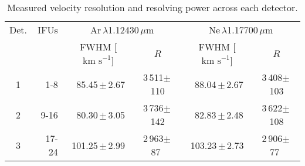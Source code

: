 \documentclass[iop]{emulateapj}
\def\lam{$\lambda$}
\def\kms{$\mbox{km s}^{-1}$}
\def\a{$\phantom{^\ast}$}
\def\o{$\phantom{0}$}
\begin{document}
\begin{table*}
\caption{Measured velocity resolution and resolving power across each detector.\label{tb:res}}
\scriptsize
\begin{center}
\begin{tabular}{crcccc}
\hline
\hline
Det. & IFUs & \multicolumn{2}{c}{Ar\,\lam1.12430\,$\mu$m}
            & \multicolumn{2}{c}{Ne\,\lam1.17700\,$\mu$m} \\
 & & FWHM [\kms] & $R$ & FWHM [\kms] & $R$ \\
  \hline
1 & 1-8 & \o85.45\,$\pm$\,2.67 & 3\,511$\pm$\,110 &
          \a88.04\,$\pm$\,2.67 & 3\,408$\pm$\,103 \\
2 & 9-16 & \o80.30\,$\pm$\,3.05 & 3\,736$\pm$\,142 &
          \a82.83\,$\pm$\,2.48 & 3\,622$\pm$\,108 \\
3 & 17-24 & 101.25\,$\pm$\,2.99 & 2\,963$\pm$\,87\a &
            103.23\,$\pm$\,2.73 & 2\,906$\pm$\,77\a \\
\hline
\end{tabular}
\end{center}
\end{table*}



\end{document}
